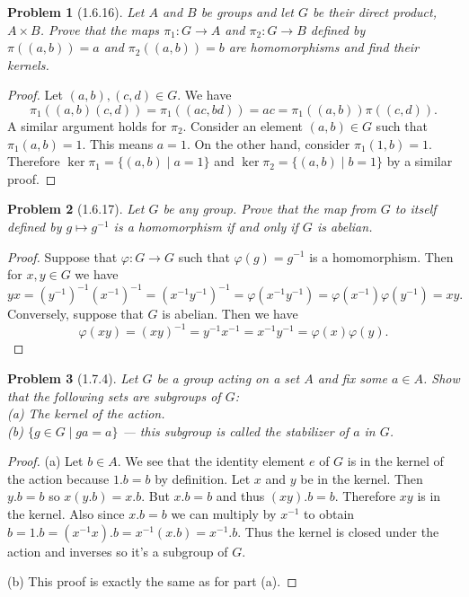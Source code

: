 \documentclass{article}
\newtheorem{problem}{Problem}
\begin{document}
\begin{problem}[1.6.16]
Let $A$ and $B$ be groups and let $G$ be their direct product, $A \times B$. Prove that the maps $\pi_1 : G \to A$ and $\pi_2 : G \to B$ defined by $\pi((a,b)) = a$ and $\pi_2((a,b)) = b$ are homomorphisms and find their kernels.
\end{problem}
\begin{proof}
Let $(a,b),(c,d) \in G$. We have
\[
\pi_1((a,b)(c,d)) = \pi_1((ac,bd)) = ac = \pi_1((a,b))\pi((c,d)).
\]
A similar argument holds for $\pi_2$. Consider an element $(a,b) \in G$ such that $\pi_1(a,b) = 1$. This means $a = 1$. On the other hand, consider $\pi_1(1,b) = 1$. Therefore $\ker \pi_1 = \{(a,b) \mid a = 1\}$ and $\ker \pi_2 = \{(a,b) \mid b = 1\}$ by a similar proof.
\end{proof}

\begin{problem}[1.6.17]
Let $G$ be any group. Prove that the map from $G$ to itself defined by $g \mapsto g^{-1}$ is a homomorphism if and only if $G$ is abelian.
\end{problem}
\begin{proof}
Suppose that $\varphi : G \to G$ such that $\varphi(g) = g^{-1}$ is a homomorphism. Then for $x,y \in G$ we have
\[
yx = (y^{-1})^{-1}(x^{-1})^{-1} = (x^{-1}y^{-1})^{-1} = \varphi(x^{-1}y^{-1}) = \varphi(x^{-1})\varphi(y^{-1}) = xy.
\]
Conversely, suppose that $G$ is abelian. Then we have
\[
\varphi(xy) = (xy)^{-1} = y^{-1}x^{-1} = x^{-1}y^{-1} = \varphi(x)\varphi(y).
\]
\end{proof}

\begin{problem}[1.7.4]
Let $G$ be a group acting on a set $A$ and fix some $a \in A$. Show that the following sets are subgroups of $G$:\\
(a) The kernel of the action.\\
(b) $\{g \in G \mid ga = a\}$ --- this subgroup is called the \emph{stabilizer} of $a$ in $G$.
\end{problem}
\begin{proof}
(a) Let $b \in A$. We see that the identity element $e$ of $G$ is in the kernel of the action because $1.b = b$ by definition. Let $x$ and $y$ be in the kernel. Then $y.b = b$ so $x(y.b) = x.b$. But $x.b = b$ and thus $(xy).b = b$. Therefore $xy$ is in the kernel. Also since $x.b = b$ we can multiply by $x^{-1}$ to obtain $b = 1.b = (x^{-1}x).b = x^{-1}(x.b) = x^{-1}.b$. Thus the kernel is closed under the action and inverses so it's a subgroup of $G$.

(b) This proof is exactly the same as for part (a).
\end{proof}
\end{document}
